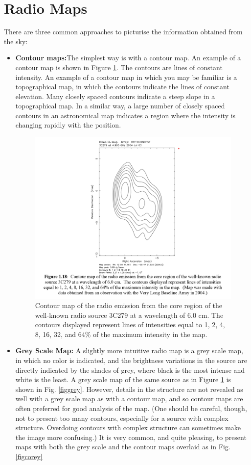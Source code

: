 \documentclass[10pt]{report}
\begin{document}
\section{Radio Maps}
There are three common approaches to picturise the information obtained from the sky:
\begin{itemize}
\item \textbf{Contour maps:}The simplest way is with a contour map.  An example of a contour map is shown in Figure \ref{figcont}.  The contours are lines of constant intensity. An example of a contour map in which you may be familiar is a topographical map, in which the contours indicate the lines of constant elevation.   Many closely spaced contours indicate a steep slope in a topographical map.  In a similar way, a large number of closely spaced contours in an astronomical map indicates a region where the intensity is changing rapidly with the position. 
\begin{figure}\label{figcont}
\includegraphics[width=\linewidth]{figcont.png}
\caption{ Contour map of the radio emission from the core region of the well-known radio source 3C279 at a wavelength of 6.0 cm.  The contours displayed represent lines of intensities equal to 1, 2, 4, 8, 16, 32, and $64\%$ of the maximum intensity in the map.}
\end{figure}
\item \textbf{Grey Scale Map:} A slightly more intuitive radio map is a grey scale map, in which no color is indicated, and the brightness variations in the source are directly indicated by the shades of grey, where black is the most intense and white is the least.  A grey scale map of the same source as in Figure \ref{figcont} is shown in Fig. \ref{figgrey}.  However, details in the structure are not revealed as well with a grey scale map as with a contour map, and so contour maps are often preferred for good analysis of the map.  (One should be careful, though, not to present too many contours, especially for a source with complex structure.  Overdoing contours with complex structure can sometimes make the image more confusing.)  It is very common, and quite pleasing, to present maps with both the grey scale and the contour maps overlaid as in Fig. \ref{figcorey}

\end{itemize}
\end{document}
